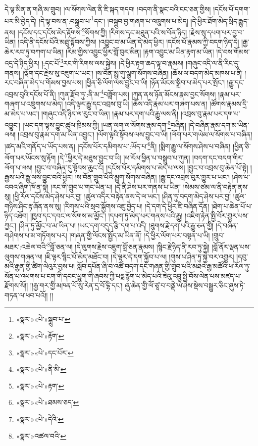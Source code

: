 དེ་ལྟ་མིན་ན་གཞི་མ་གྲུབ། །ལ་སོགས་ལེན་ནི་ཇི་སྐད་གདབ། །བདག་ནི་སྣང་བའི་ངང་ཅན་གྱིས། །དངོས་པོ་དགག་པར་མི་བྱེད་དེ། །དེ་ལྟ་བས་ན་:བསྒྲུབ་པ་\footnote{«སྣར་»«པེ་»སྒྲུབ་པ་}དང་། །བསྒྲུབ་བྱ་གཞག་པ་འཁྲུགས་པ་མེད། །དེ་ཕྱིར་ཐོག་མེད་སྲིད་རྒྱུད་ནས། །དངོས་དང་དངོས་མེད་རྟོགས་\footnote{«སྣར་»«པེ་»རྟོག་}སོགས་ཀྱི། །རིགས་དང་མཐུན་པའི་ས་བོན་ཉིད། །རྗེས་སུ་དཔག་པར་བྱ་བ་ཡིན། །འདི་ནི་དངོས་པོའི་མཐུ་སྟོབས་ཀྱིས། །འབྱུང་བ་མ་ཡིན་དེ་མེད་ཕྱིར། །དངོས་པོ་རྣམས་ཀྱི་བདག་ཉིད་དེ། །རྒྱ་ཆེར་རབ་ཏུ་བཀག་པ་ཡིན། །རིམ་གྱིས་འབྱུང་ཕྱིར་གློ་བུར་མིན། །རྟག་འབྱུང་མ་ཡིན་རྟག་མ་ཡིན། །དེ་བས་གོམས་འདྲ་དེ་ཉིད་ཕྱིར། །:དང་པོ་\footnote{«སྣར་»«པེ་»དང་པོར་}རང་གི་རིགས་ལས་སྐྱེས། །དེ་ཕྱིར་རྟག་ཆད་ལྟ་བ་རྣམས། །གཞུང་འདི་ལ་ནི་རིང་དུ་གནས། །ལྡོག་དང་རྗེས་སུ་འཇུག་པ་ཡང་། །ས་བོན་མྱུ་གུ་ལྕུག་སོགས་བཞིན། །ཆོས་ལ་བདག་མེད་མཁས་པ་ནི། །རང་བཞིན་མེད་པ་གོམས་བྱས་པས། །ཕྱིན་ཅི་ལོག་ལས་བྱུང་བ་ཡི། །ཉོན་མོངས་སྒྲིབ་པ་མེད་པར་སྤོང་། །རྒྱུ་དང་འབྲས་བུའི་དངོས་པོ་ནི། །ཀུན་རྫོབ་ཏུ་:ནི་མ་\footnote{«སྣར་»«པེ་»ནི་མི་}བཟློག་པས། །ཀུན་ནས་ཉོན་མོངས་རྣམ་བྱང་སོགས། །རྣམ་པར་གཞག་པ་འཁྲུགས་པ་མེད། །འདི་ལྟར་རྒྱུ་དང་འབྲས་བུ་ཡི། །ཆོས་འདི་རྣམ་པར་གཞག་པས་ན། །ཚོགས་རྣམས་དྲི་མ་མེད་པ་ཡང་། །གཞུང་འདི་ཉིད་ལ་རུང་བ་ཡིན། །རྣམ་པར་དག་པའི་རྒྱུ་ལས་ནི། །འབྲས་བུ་རྣམ་པར་དག་པ་འབྱུང་། །ཡང་དག་ལྟས་བྱུང་ཚུལ་ཁྲིམས་ཀྱི། །ཡན་ལག་ལ་སོགས་རྣམ་དག་\footnote{«སྣར་»«པེ་»རྟག་}བཞིན། །དེ་བཞིན་རྣམ་དག་མ་ཡིན་ལས། །འབྲས་བུ་རྣམ་དག་མ་ཡིན་འབྱུང་། །ལོག་ལྟའི་སྟོབས་ལས་བྱུང་བ་ཡི། །ལོག་པར་གཡེམ་ལ་སོགས་པ་བཞིན། །ཚད་མའི་གནོད་པ་ཡོད་པས་ན། །དངོས་པོར་དམིགས་པ་:ཡོད་པ་\footnote{«སྣར་»«པེ་»ཐམས་ཅད་}ནི། །སྨིག་རྒྱུ་ལ་སོགས་ཤེས་པ་བཞིན། །ཕྱིན་ཅི་ལོག་པར་ཡོངས་སུ་རྟོག །དེ་\footnote{«སྣར་»«པེ་»དེའི་}ཕྱིར་དེ་མཐུས་བྱུང་བ་ཡི། །ཕ་རོལ་ཕྱིན་པ་བསྒྲུབ་པ་ཀུན། །བདག་དང་བདག་གིར་ལོག་པ་ལས། །བྱུང་བ་བཞིན་དུ་སྟོབས་ཆུང་ངོ། །དངོས་པོར་དམིགས་པ་མེད་པ་ལས། །བྱུང་བ་འབྲས་བུ་ཆེན་པོ་སྟེ། །
རྒྱས་པའི་རྒྱུ་ལས་བྱུང་བའི་ཕྱིར། །ས་བོན་གྲུབ་པོའི་མྱུག་སོགས་བཞིན། །རྒྱུ་དང་འབྲས་བུར་གྱུར་པ་ཡང་། །ཤེས་པ་འབའ་ཞིག་ཁོ་ན་སྟེ། །རང་གི་གྲུབ་པ་གང་ཡིན་པ། །དེ་ནི་ཤེས་པར་གནས་པ་ཡིན། །སེམས་ཙམ་ལ་ནི་བརྟེན་ནས་སུ། །ཕྱི་རོལ་དངོས་མེད་ཤེས་པར་བྱ། །ཚུལ་འདིར་བརྟེན་ནས་དེ་ལ་ཡང་། །ཤིན་ཏུ་བདག་མེད་ཤེས་པར་བྱ། །ཚུལ་གཉིས་ཤིང་རྟ་ཞོན་ནས་སུ། །རིགས་པའི་སྲབ་སྐྱོགས་འཇུ་བྱེད་པ། །དེ་དག་དེ་ཕྱིར་ཇི་བཞིན་དོན། །ཐེག་པ་ཆེན་པོ་པ་ཉིད་འཐོབ། །ཁྱབ་དང་དབང་ལ་སོགས་མ་མྱོང་། །དཔག་ཏུ་མེད་པར་གནས་པའི་རྒྱུ། །འཇིག་རྟེན་སྤྱི་བོར་གྱུར་པས་ཀྱང་། །ཤིན་ཏུ་མྱོང་བ་མ་ཡིན་པ། །ཡང་དག་བདུད་རྩི་དག་པ་འདི། །ཐུགས་རྗེ་དག་པའི་རྒྱུ་ཅན་གྱི། །དེ་བཞིན་གཤེགས་པ་མ་གཏོགས་པར། །གཞན་གྱི་ལོངས་སྤྱོད་མ་ཡིན་ནོ། །དེ་ཕྱིར་ལོག་པར་བསྟན་པ་ཡི། །གྲུབ་མཐར་:འཆེལ་བའི་\footnote{«སྣར་»འཚལ་བའི་}བློ་ཅན་ལ། །དེ་ལུགས་རྗེས་འཇུག་བློ་ཅན་རྣམས། །སྙིང་རྗེ་ཉིད་ནི་རབ་ཏུ་སྐྱེ། །བློ་ནོར་ལྡན་པས་ལུགས་གཞན་ལ། །ཇི་ལྟར་སྙིང་པོ་མེད་མཐོང་བ། །དེ་ལྟར་དེ་དག་སྐྱོབ་པ་ལ། །གུས་པ་ཤིན་ཏུ་སྐྱེ་བར་འགྱུར། །དབུ་མའི་རྒྱན་གྱི་ཚིག་ལེའུར་བྱས་པ། སློབ་དཔོན་ཞི་བ་འཚོ་བདག་དང་གཞན་གྱི་གྲུབ་པའི་མཐའ་རྒྱ་མཚོའི་ཕ་རོལ་ཏུ་སོན་པ་འཕགས་པ་ངག་གི་དབང་ཕྱུག་གི་ཞབས་ཀྱི་པདྨ་རྙོག་པ་མེད་པའི་ཟེའུ་འབྲུ་སྤྱི་བོས་ལེན་པས་མཛད་པ་རྫོགས་སོ།། །།རྒྱ་གར་གྱི་མཁན་པོ་སུ་རེན་དྲ་བོ་དྷི་དང་། ཞུ་ཆེན་གྱི་ལོ་ཙཱ་བ་བནྡེ་ཡེ་ཤེས་སྡེས་བསྒྱུར་ཅིང་ཞུས་ཏེ་གཏན་ལ་ཕབ་པའོ།། །།